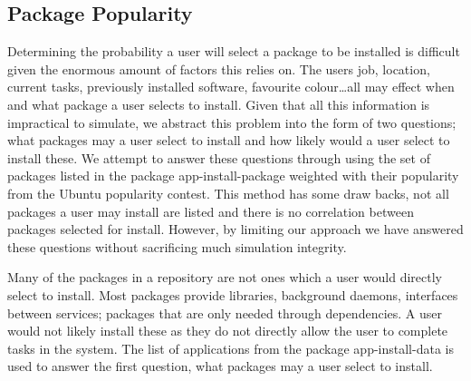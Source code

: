





\subsection{Package Popularity}
{}Determining the probability a user will select a package to be installed is difficult given the enormous amount of factors this relies on.
{}The users job, location, current tasks, previously installed software, favourite colour\ldots all may effect when and what package a user selects to install.
{}Given that all this information is impractical to simulate, we abstract this problem into the form of two questions;
{}what packages may a user select to install and how likely would a user select to install these.
{}We attempt to answer these questions through using the set of packages listed in the package app-install-package
{}weighted with their popularity from the Ubuntu popularity contest.
{}This method has some draw backs, not all packages a user may install are listed and there is no correlation between packages selected for install.
{}However, by limiting our approach we have answered these questions without sacrificing much simulation integrity.

Many of the packages in a repository are not ones which a user would directly select to install.
Most packages provide libraries, background daemons, interfaces between services; packages that are only needed through dependencies.
A user would not likely install these as they do not directly allow the user to complete tasks in the system.
The list of applications from the package app-install-data is used to answer the first question, what packages may a user select to install.

